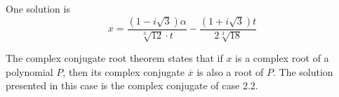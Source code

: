 One solution is
\[x = \frac{(1-i \sqrt{3}) \alpha}{\sqrt[3]{12} \cdot t}
     -\frac{(1+i\sqrt{3}) t}{2\sqrt[3]{18}}\]

The complex conjugate root theorem states
that if $x$ is a complex root of a polynomial $P$, then its
complex conjugate $\overline{x}$ is also a root of $P$.
The solution presented in this case is the complex conjugate of
case 2.2.
